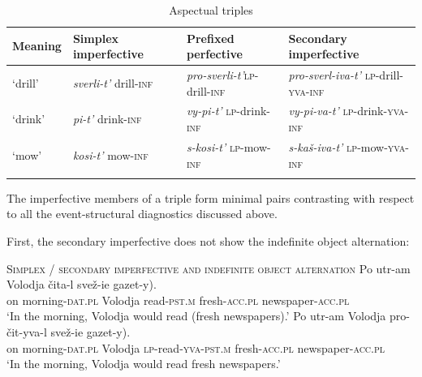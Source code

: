 \documentclass[output=paper,colorlinks,citecolor=brown]{langscibook}
\begin{document}
\begin{table}
\caption{Aspectual triples}
\label{tab:key:4}
\begin{tabularx}{\textwidth}{XXXX}
\lsptoprule
Meaning & Simplex \newline imperfective & Prefixed \newline perfective & Secondary \newline imperfective\\\midrule
‘drill’ & \textit{sverli-t’} \newline drill-\textsc{inf} & \textit{pro-sverli-t’}\newline \textsc{lp}-drill-\textsc{inf} & \textit{pro-sverl-iva-t’} \newline \textsc{lp}-drill-\textsc{yva-inf}\smallskip\\
‘drink’ & \textit{pi-t’} \newline  drink-\textsc{inf} & \textit{vy-pi-t’}  \newline \textsc{lp}-drink-\textsc{inf} & \textit{vy-pi-va-t’} \newline \textsc{lp}-drink-\textsc{yva-inf}\smallskip\\
‘mow’ & \textit{kosi-t’} \newline mow-\textsc{inf} & \textit{s-kosi-t’} \newline \textsc{lp}-mow-\textsc{inf} & \textit{s-kaš-iva-t’} \newline \textsc{lp}-mow-\textsc{yva-inf}\\
\lspbottomrule
\end{tabularx}
\end{table}

The imperfective members of a triple form minimal pairs contrasting with respect to all the event-structural diagnostics discussed above. 

First, the secondary imperfective does not show the indefinite object alternation: 

\ea   \textsc{Simplex / secondary imperfective and indefinite object alternation}\label{tat:ex:57}
\ea
\gll Po  utr-am  Volodja  čita-l  \minsp{(} svež-ie gazet-y).\\
    on  morning-\textsc{dat.pl}  Volodja  read-\textsc{pst.m}  {} fresh-\textsc{acc.pl} newspaper-\textsc{acc.pl}\\
\glt   ‘In the morning, Volodja would read (fresh newspapers).’\label{ex:tatevosov:57a}
\ex \gll   Po  utr-am  Volodja  pro-čit-yva-l  \minsp{*(} svež-ie gazet-y).\\
    on  morning-\textsc{dat.pl}  Volodja  \textsc{lp}-read-\textsc{yva}-\textsc{pst.m}  {} fresh-\textsc{acc.pl} newspaper-\textsc{acc.pl}\\
\glt  ‘In the morning, Volodja would read fresh newspapers.’\label{ex:tatevosov:57b}
\z
\z
\end{document}
